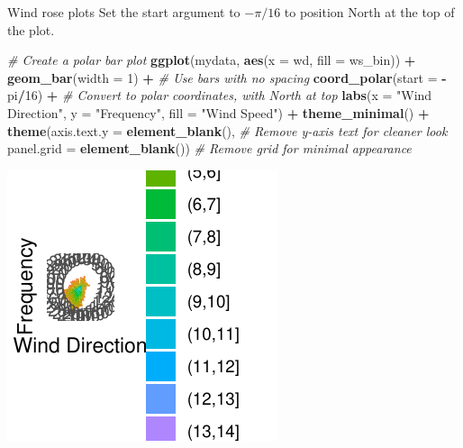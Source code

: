 \documentclass[
  ignorenonframetext,
]{beamer}
\newenvironment{Shaded}{\begin{snugshade}}{\end{snugshade}}
\newcommand{\AttributeTok}[1]{\textcolor[rgb]{0.13,0.29,0.53}{#1}}
\newcommand{\CommentTok}[1]{\textcolor[rgb]{0.56,0.35,0.01}{\textit{#1}}}
\newcommand{\DecValTok}[1]{\textcolor[rgb]{0.00,0.00,0.81}{#1}}
\newcommand{\FunctionTok}[1]{\textcolor[rgb]{0.13,0.29,0.53}{\textbf{#1}}}
\newcommand{\NormalTok}[1]{#1}
\newcommand{\SpecialCharTok}[1]{\textcolor[rgb]{0.81,0.36,0.00}{\textbf{#1}}}
\newcommand{\StringTok}[1]{\textcolor[rgb]{0.31,0.60,0.02}{#1}}
\begin{document}
\begin{frame}[fragile]{Wind rose plots}
\label{wind-rose-plots-4}
Set the start argument to \(-\pi/16\) to position North at the top of
the plot.


\begin{Shaded}
\begin{Highlighting}[]
\CommentTok{\# Create a polar bar plot}
\FunctionTok{ggplot}\NormalTok{(mydata, }\FunctionTok{aes}\NormalTok{(}\AttributeTok{x =}\NormalTok{ wd, }\AttributeTok{fill =}\NormalTok{ ws\_bin)) }\SpecialCharTok{+} 
  \FunctionTok{geom\_bar}\NormalTok{(}\AttributeTok{width =} \DecValTok{1}\NormalTok{) }\SpecialCharTok{+}  \CommentTok{\# Use bars with no spacing}
  \FunctionTok{coord\_polar}\NormalTok{(}\AttributeTok{start =} \SpecialCharTok{{-}}\NormalTok{pi}\SpecialCharTok{/}\DecValTok{16}\NormalTok{) }\SpecialCharTok{+}  \CommentTok{\# Convert to polar coordinates, with North at top}
  \FunctionTok{labs}\NormalTok{(}\AttributeTok{x =} \StringTok{"Wind Direction"}\NormalTok{, }\AttributeTok{y =} \StringTok{"Frequency"}\NormalTok{, }\AttributeTok{fill =} \StringTok{"Wind Speed"}\NormalTok{) }\SpecialCharTok{+}
  \FunctionTok{theme\_minimal}\NormalTok{() }\SpecialCharTok{+}
  \FunctionTok{theme}\NormalTok{(}\AttributeTok{axis.text.y =} \FunctionTok{element\_blank}\NormalTok{(),  }\CommentTok{\# Remove y{-}axis text for cleaner look}
        \AttributeTok{panel.grid =} \FunctionTok{element\_blank}\NormalTok{())   }\CommentTok{\# Remove grid for minimal appearance}
\end{Highlighting}
\end{Shaded}

\begin{center}\includegraphics[width=0.5\linewidth]{Figs/unnamed-chunk-71-1} \end{center}
\end{frame}
\end{document}
